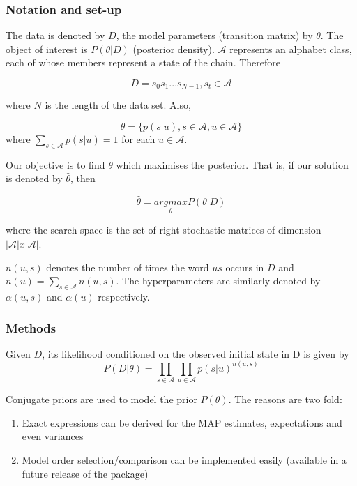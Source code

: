\documentclass[
  nojss]{jss}
\providecommand{\tightlist}{%
  \setlength{\itemsep}{0pt}\setlength{\parskip}{0pt}}
\begin{document}
\hypertarget{notation-and-set-up}{%
\subsubsection{Notation and set-up}\label{notation-and-set-up}}

The data is denoted by \(D\), the model parameters (transition matrix) by \(\theta\). The object of interest is \(P(\theta | D)\) (posterior density). \(\mathcal{A}\) represents an alphabet class, each of whose members represent a state of the chain. Therefore

\[D = s_0 s_1 ... s_{N-1}, s_t \in \mathcal{A}\]

where \(N\) is the length of the data set. Also,

\[\theta = \{p(s|u), s \in \mathcal{A}, u \in \mathcal{A}  \}\]
where \(\sum_{s \in \mathcal{A}} p(s|u) = 1\) for each \(u \in \mathcal{A}\).

Our objective is to find \(\theta\) which maximises the posterior. That is, if our solution is denoted by \(\hat{\theta}\), then

\[\hat{\theta} = \underset{\theta}{argmax}P(\theta | D)\]

where the search space is the set of right stochastic matrices of dimension \(|\mathcal{A}|x|\mathcal{A}|\).

\(n(u, s)\) denotes the number of times the word \(us\) occurs in \(D\) and \(n(u)=\sum_{s \in \mathcal{A}}n(u, s)\). The hyperparameters are similarly denoted by \(\alpha(u, s)\) and \(\alpha(u)\) respectively.

\hypertarget{methods}{%
\subsubsection{Methods}\label{methods}}

Given \(D\), its likelihood conditioned on the observed initial state in D is given by
\[P(D|\theta) = \prod_{s \in \mathcal{A}} \prod_{u \in \mathcal{A}} p(s|u)^{n(u, s)}\]

Conjugate priors are used to model the prior \(P(\theta)\). The reasons are two fold:

\begin{enumerate}
\def\labelenumi{\arabic{enumi}.}
\tightlist
\item
  Exact expressions can be derived for the MAP estimates, expectations and even variances
\item
  Model order selection/comparison can be implemented easily (available in a future release of the package)
\end{enumerate}
\end{document}

